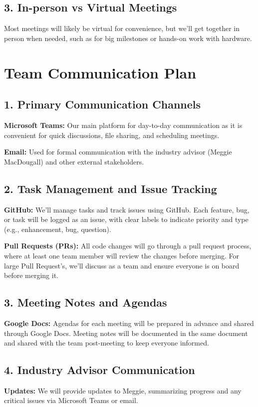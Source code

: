 \documentclass{article}
\begin{document}
\subsection*{3. In-person vs Virtual Meetings}
Most meetings will likely be virtual for convenience, but we’ll get together in person when needed, such as for big milestones or hands-on work with hardware.


\section{Team Communication Plan}

\subsection*{1. Primary Communication Channels}
\textbf{Microsoft Teams:} Our main platform for day-to-day communication as it is convenient for quick discussions, file sharing, and scheduling meetings.

\textbf{Email:} Used for formal communication with the industry advisor (Meggie MacDougall) and other external stakeholders.

\subsection*{2. Task Management and Issue Tracking}
\textbf{GitHub:} We’ll manage tasks and track issues using GitHub. Each feature, bug, or task will be logged as an issue, with clear labels to indicate priority and type (e.g., enhancement, bug, question).

\textbf{Pull Requests (PRs):} All code changes will go through a pull request process, where at least one team member will review the changes before merging. For large Pull Request's, we’ll discuss as a team and ensure everyone is on board before merging it.

\subsection*{3. Meeting Notes and Agendas}
\textbf{Google Docs:} Agendas for each meeting will be prepared in advance and shared through Google Docs. Meeting notes will be documented in the same document and shared with the team post-meeting to keep everyone informed.

\subsection*{4. Industry Advisor Communication}
\textbf{Updates:} We will provide updates to Meggie, summarizing progress and any critical issues via Microsoft Teams or email.
\end{document}
